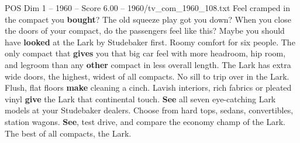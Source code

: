 \begin{textsample}{POS Dim 1 – 1960 – Score 6.00 – 1960/tv\_com\_1960\_108.txt}  \label{ex:f1_pos_030}
Feel cramped in the compact you \textbf{bought}?
The old squeeze play got you down?
When you close the doors of your compact, do the passengers feel like this?
Maybe you should have \textbf{looked} at the Lark by Studebaker first.
Roomy comfort for six people.
The only compact that \textbf{gives} you that big car feel with more headroom, hip room, and legroom than any \textbf{other} compact in less overall length.
The Lark has extra wide doors, the highest, widest of all compacts.
No sill to trip over in the Lark.
Flush, flat floors \textbf{make} cleaning a cinch.
Lavish interiors, rich fabrics or pleated vinyl \textbf{give} the Lark that continental touch. \textbf{See} all seven eye-catching Lark models at your Studebaker dealers.
Choose from hard tops, sedans, convertibles, station wagons. \textbf{See}, test drive, and compare the economy champ of the Lark.
The best of all compacts, the Lark.

\end{textsample}
